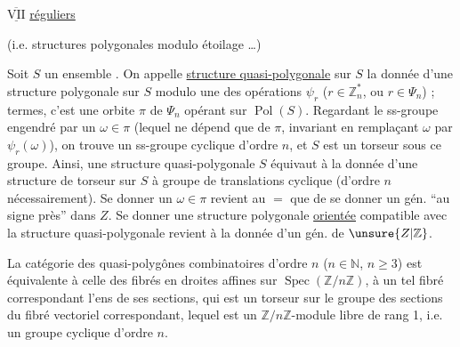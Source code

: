 $\overline{\underline{\mathrm{VII}}}$   \uline{réguliers}  

(i.e. structures polygonales modulo étoilage \ldots)

Soit $S$ un ensemble . On appelle \uline{structure quasi-polygonale}  sur $S$ la donnée d'une structure polygonale
sur $S$ modulo une des opérations $\psi_r$ ($r\in\mathbb Z_n^{*}$, ou $r\in\Psi_n$) ;   termes, c'est une orbite $\pi$ de $\Psi_n$ opérant sur $\operatorname{Pol}(S)$. Regardant le ss-groupe  engendré par un $\omega\in\pi$ (lequel ne dépend que de $\pi$,   invariant en remplaçant $\omega$ par $\psi_r(\omega)$), on trouve un ss-groupe cyclique d'ordre $n$, et $S$ est un torseur sous ce groupe. Ainsi, une structure quasi-polygonale  $S$ équivaut à la donnée d'une structure de torseur sur $S$ à groupe de  translations  cyclique (d'ordre $n$ nécessairement). Se donner un $\omega\in\pi$ revient au $=$ que de se donner un gén. ``au signe près'' dans $Z$. Se donner une structure polygonale \uline{orientée} compatible avec la structure quasi-polygonale revient à la donnée d'un gén. de $\unsure{Z|\mathbb Z}$.

La catégorie des  quasi-polygônes combinatoires d'ordre $n$ ($n\in\mathbb N$, $n\geq3$) est équivalente à celle des fibrés en droites affines sur $\operatorname{Spec}(\mathbb Z/n\mathbb Z)$, à un tel
fibré correspondant l'ens de ses sections, qui est un torseur sur le groupe  des sections du fibré vectoriel correspondant, lequel est un $\mathbb Z/n\mathbb Z$-module libre de rang 1, i.e. un groupe cyclique d'ordre $n$.

